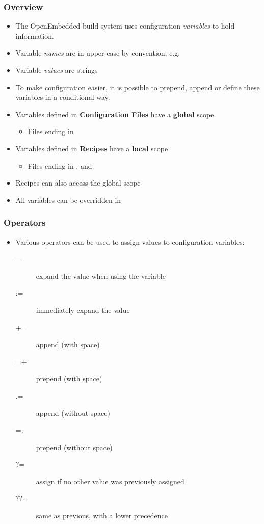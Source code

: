 \begin{frame}
  \frametitle{Overview}
  \begin{itemize}
    \item The OpenEmbedded build system uses configuration {\em variables}
      to hold information.
    \item Variable {\em names} are in upper-case by convention, e.g.
    \item Variable {\em values} are strings
    \item To make configuration easier, it is possible to prepend,
      append or define these variables in a conditional way.
    \item Variables defined in \textbf{Configuration Files} have a \textbf{global} scope
      \begin{itemize}
      \item Files ending in 
      \end{itemize}
    \item Variables defined in \textbf{Recipes} have a \textbf{local} scope
      \begin{itemize}
      \item Files ending in ,  and 
      \end{itemize}
    \item Recipes can also access the global scope
    \item All variables can be overridden in
  \end{itemize}
\end{frame}

\begin{frame}
  \frametitle{Operators}
  \begin{itemize}
    \item Various operators can be used to assign values to
    configuration variables:
      \begin{description}
        \item[=] expand the value when using the variable
        \item[:=] immediately expand the value
        \item[+=] append (with space)
        \item[=+] prepend (with space)
        \item[.=] append (without space)
        \item[=.] prepend (without space)
        \item[?=] assign if no other value was previously assigned
        \item[??=] same as previous, with a lower precedence
      \end{description}
  \end{itemize}
\end{frame}

